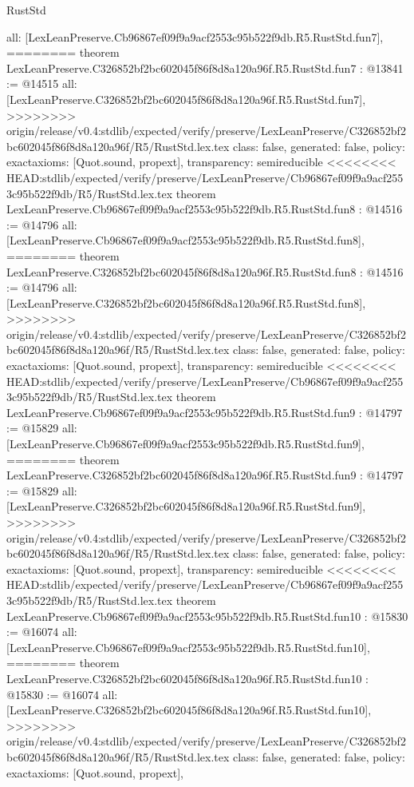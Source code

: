 \begin{lexlean}{RustStd}
\begin{coremodule}
{\begin{coremodule}
{{{{{{{{{{  all: [LexLeanPreserve.Cb96867ef09f9a9acf2553c95b522f9db.R5.RustStd.fun7],
========
theorem LexLeanPreserve.C326852bf2bc602045f86f8d8a120a96f.R5.RustStd.fun7 : @13841 := @14515 {
  all: [LexLeanPreserve.C326852bf2bc602045f86f8d8a120a96f.R5.RustStd.fun7],
>>>>>>>> origin/release/v0.4:stdlib/expected/verify/preserve/LexLeanPreserve/C326852bf2bc602045f86f8d8a120a96f/R5/RustStd.lex.tex
  class: false,
  generated: false,
  policy: exact{axioms: [Quot.sound, propext]},
  transparency: semireducible
}
<<<<<<<< HEAD:stdlib/expected/verify/preserve/LexLeanPreserve/Cb96867ef09f9a9acf2553c95b522f9db/R5/RustStd.lex.tex
theorem LexLeanPreserve.Cb96867ef09f9a9acf2553c95b522f9db.R5.RustStd.fun8 : @14516 := @14796 {
  all: [LexLeanPreserve.Cb96867ef09f9a9acf2553c95b522f9db.R5.RustStd.fun8],
========
theorem LexLeanPreserve.C326852bf2bc602045f86f8d8a120a96f.R5.RustStd.fun8 : @14516 := @14796 {
  all: [LexLeanPreserve.C326852bf2bc602045f86f8d8a120a96f.R5.RustStd.fun8],
>>>>>>>> origin/release/v0.4:stdlib/expected/verify/preserve/LexLeanPreserve/C326852bf2bc602045f86f8d8a120a96f/R5/RustStd.lex.tex
  class: false,
  generated: false,
  policy: exact{axioms: [Quot.sound, propext]},
  transparency: semireducible
}
<<<<<<<< HEAD:stdlib/expected/verify/preserve/LexLeanPreserve/Cb96867ef09f9a9acf2553c95b522f9db/R5/RustStd.lex.tex
theorem LexLeanPreserve.Cb96867ef09f9a9acf2553c95b522f9db.R5.RustStd.fun9 : @14797 := @15829 {
  all: [LexLeanPreserve.Cb96867ef09f9a9acf2553c95b522f9db.R5.RustStd.fun9],
========
theorem LexLeanPreserve.C326852bf2bc602045f86f8d8a120a96f.R5.RustStd.fun9 : @14797 := @15829 {
  all: [LexLeanPreserve.C326852bf2bc602045f86f8d8a120a96f.R5.RustStd.fun9],
>>>>>>>> origin/release/v0.4:stdlib/expected/verify/preserve/LexLeanPreserve/C326852bf2bc602045f86f8d8a120a96f/R5/RustStd.lex.tex
  class: false,
  generated: false,
  policy: exact{axioms: [Quot.sound, propext]},
  transparency: semireducible
}
<<<<<<<< HEAD:stdlib/expected/verify/preserve/LexLeanPreserve/Cb96867ef09f9a9acf2553c95b522f9db/R5/RustStd.lex.tex
theorem LexLeanPreserve.Cb96867ef09f9a9acf2553c95b522f9db.R5.RustStd.fun10 : @15830 := @16074 {
  all: [LexLeanPreserve.Cb96867ef09f9a9acf2553c95b522f9db.R5.RustStd.fun10],
========
theorem LexLeanPreserve.C326852bf2bc602045f86f8d8a120a96f.R5.RustStd.fun10 : @15830 := @16074 {
  all: [LexLeanPreserve.C326852bf2bc602045f86f8d8a120a96f.R5.RustStd.fun10],
>>>>>>>> origin/release/v0.4:stdlib/expected/verify/preserve/LexLeanPreserve/C326852bf2bc602045f86f8d8a120a96f/R5/RustStd.lex.tex
  class: false,
  generated: false,
  policy: exact{axioms: [Quot.sound, propext]},
}}}}}}}}}}}}}}
\end{coremodule}}
\end{coremodule}
\end{lexlean}
